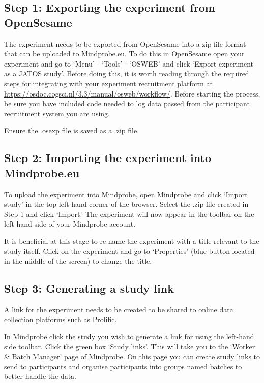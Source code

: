 \documentclass[
  12pt,
]{book}
\begin{document}
\subsection{Step 1: Exporting the experiment from OpenSesame}\label{step-1-exporting-the-experiment-from-opensesame}

The experiment needs to be exported from OpenSesame into a zip file format that can be uploaded to Mindprobe.eu.
To do this in OpenSesame open your experiment and go to `Menu' - `Tools' - `OSWEB' and click `Export experiment as a JATOS study'. Before doing this, it is worth reading through the required steps for integrating with your experiment recruitment platform at \url{https://osdoc.cogsci.nl/3.3/manual/osweb/workflow/}. Before starting the process, be sure you have included code needed to log data passed from the participant recruitment system you are using.

Ensure the .osexp file is saved as a .zip file.

\subsection{Step 2: Importing the experiment into Mindprobe.eu}\label{step-2-importing-the-experiment-into-mindprobe.eu}

To upload the experiment into Mindprobe, open Mindprobe and click `Import study' in the top left-hand corner of the browser.
Select the .zip file created in Step 1 and click `Import.'
The experiment will now appear in the toolbar on the left-hand side of your Mindprobe account.

It is beneficial at this stage to re-name the experiment with a title relevant to the study itself. Click on the experiment and go to `Properties' (blue button located in the middle of the screen) to change the title.

\subsection{Step 3: Generating a study link}\label{step-3-generating-a-study-link}

A link for the experiment needs to be created to be shared to online data collection platforms such as Prolific.

In Mindprobe click the study you wish to generate a link for using the left-hand side toolbar.
Click the green box `Study links'. This will take you to the `Worker \& Batch Manager' page of Mindprobe. On this page you can create study links to send to participants and organise participants into groups named batches to better handle the data.
\end{document}
